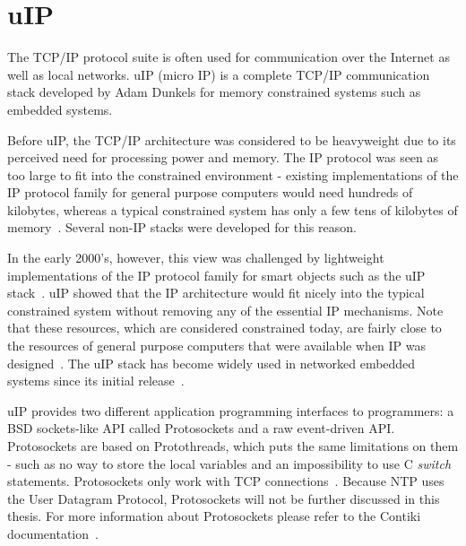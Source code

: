 
\section{uIP}\label{sec:contiki-uip}
The TCP/IP protocol suite is often used for communication over the Internet as well as local networks.
uIP (micro IP) is a complete TCP/IP communication stack developed by Adam Dunkels
for memory constrained systems such as embedded systems.

Before uIP, the TCP/IP architecture was considered to be heavyweight
due to its perceived need for processing power and memory.
The IP protocol was seen as too large to fit into the constrained environment -
existing implementations of the IP protocol family for general purpose computers would need hundreds
of kilobytes, whereas a typical constrained system has only a few tens of kilobytes of memory~\cite{interconnecting}.
Several non-IP stacks were developed for this reason.

In the early 2000's, however, this view was challenged by lightweight implementations of the IP
protocol family for smart objects such as the uIP stack~\cite{interconnecting}.
uIP showed that the IP architecture would fit nicely into the typical constrained system
without removing any of the essential IP mechanisms.
Note that these resources, which are considered constrained today, are fairly close to the
resources of general purpose computers that were available when IP was designed~\cite{interconnecting}.
The uIP stack has become widely used in networked embedded systems
since its initial release~\cite{interconnecting, thesis-programming}.

uIP provides two different application programming interfaces to programmers:
a BSD sockets-like API called Protosockets and a raw event-driven API.
Protosockets are based on Protothreads, which puts the same limitations on them - such as
no way to store the local variables and an impossibility to use C {\it switch} statements.
Protosockets only work with TCP connections~\cite{contiki-docs}.
Because NTP uses the User Datagram Protocol, Protosockets will not be further
discussed in this thesis. For more information about Protosockets
please refer to the Contiki documentation~\cite{contiki-docs}.

